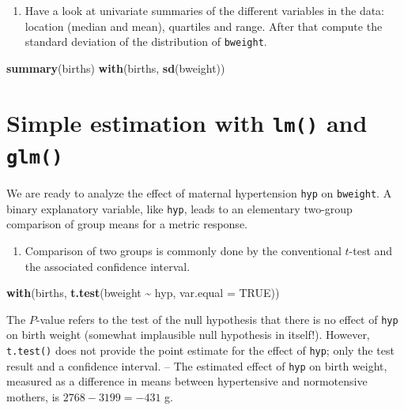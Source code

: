 \documentclass[
]{book}
\newenvironment{Shaded}{\begin{snugshade}}{\end{snugshade}}
\newcommand{\AttributeTok}[1]{\textcolor[rgb]{0.13,0.29,0.53}{#1}}
\newcommand{\ConstantTok}[1]{\textcolor[rgb]{0.56,0.35,0.01}{#1}}
\newcommand{\FunctionTok}[1]{\textcolor[rgb]{0.13,0.29,0.53}{\textbf{#1}}}
\newcommand{\NormalTok}[1]{#1}
\newcommand{\SpecialCharTok}[1]{\textcolor[rgb]{0.81,0.36,0.00}{\textbf{#1}}}
\providecommand{\tightlist}{%
  \setlength{\itemsep}{0pt}\setlength{\parskip}{0pt}}
\begin{document}
\begin{enumerate}
\def\labelenumi{\arabic{enumi}.}
\setcounter{enumi}{2}
\tightlist
\item
  Have a look at univariate summaries of the different
  variables in the data:
  location (median and mean), quartiles and range. After that compute
  the standard deviation of the distribution of \texttt{bweight}.
\end{enumerate}

\begin{Shaded}
\begin{Highlighting}[]
\FunctionTok{summary}\NormalTok{(births)}
\FunctionTok{with}\NormalTok{(births, }\FunctionTok{sd}\NormalTok{(bweight))}
\end{Highlighting}
\end{Shaded}

\section{\texorpdfstring{Simple estimation with \texttt{lm()} and \texttt{glm()}}{Simple estimation with lm() and glm()}}\label{simple-estimation-with-lm-and-glm}

We are ready to analyze the effect of maternal hypertension \texttt{hyp} on \texttt{bweight}.
A binary explanatory variable, like \texttt{hyp}, leads to an elementary
two-group comparison of group
means for a metric response.

\begin{enumerate}
\def\labelenumi{\arabic{enumi}.}
\tightlist
\item
  Comparison of two groups is commonly done by the conventional \(t\)-test and
  the associated confidence interval.
\end{enumerate}

\begin{Shaded}
\begin{Highlighting}[]
\FunctionTok{with}\NormalTok{(births, }\FunctionTok{t.test}\NormalTok{(bweight }\SpecialCharTok{\textasciitilde{}}\NormalTok{ hyp, }\AttributeTok{var.equal =} \ConstantTok{TRUE}\NormalTok{))}
\end{Highlighting}
\end{Shaded}

The \(P\)-value refers to the test
of the null hypothesis that there is no effect of \texttt{hyp} on birth weight
(somewhat implausible null hypothesis in itself!).
However, \texttt{t.test()} does not provide
the point estimate for the effect of \texttt{hyp}; only the test result and a confidence interval. -- The estimated effect of \texttt{hyp} on birth weight,
measured as a difference in means between hypertensive and normotensive
mothers, is \(2768-3199 = -431\) g.
\end{document}
